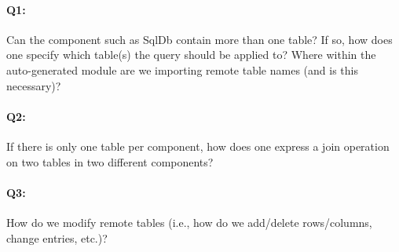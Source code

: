 \paragraph*{Q1:}  Can the component such as SqlDb contain more than one table?  If so, how does one specify which table(s) the query should be applied to?  Where within the auto-generated module are we importing remote table names (and is this necessary)?

\paragraph*{Q2:}  If there is only one table per component, how does one express a join operation on two tables in two different components?

\paragraph*{Q3:}  How do we modify remote tables (i.e., how do we add/delete rows/columns, change entries, etc.)?
